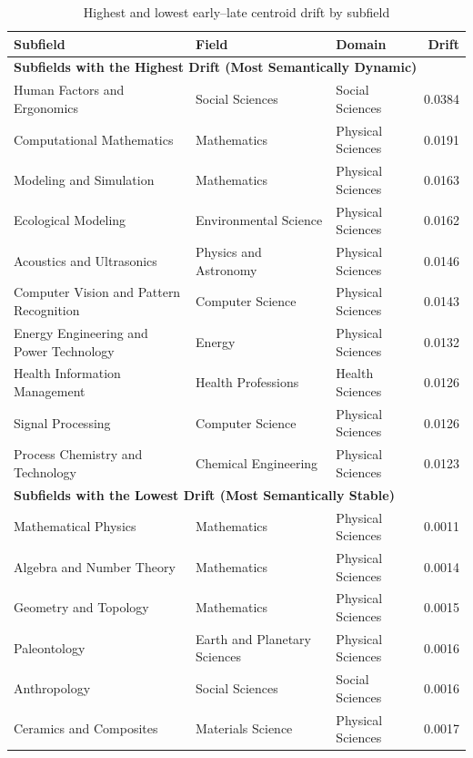 \begin{table}[H]
\centering
\caption[Net semantic displacement extremes]{Highest and lowest early--late centroid drift by subfield}
\label{tab:centroid_drift_extremes}
\scriptsize
\begin{tabular}{@{}p{}p{}p{}r@{}}
\hline
\textbf{Subfield} & \textbf{Field} & \textbf{Domain} & \textbf{Drift} \\
\hline
\multicolumn{4}{l}{\textbf{Subfields with the Highest Drift (Most Semantically Dynamic)}} \\
\hline
Human Factors and Ergonomics & Social Sciences & Social Sciences & 0.0384 \\[0.12cm]
Computational Mathematics & Mathematics & Physical Sciences & 0.0191 \\[0.12cm]
Modeling and Simulation & Mathematics & Physical Sciences & 0.0163 \\[0.12cm]
Ecological Modeling & Environmental Science & Physical Sciences & 0.0162 \\[0.12cm]
Acoustics and Ultrasonics & Physics and Astronomy & Physical Sciences & 0.0146 \\[0.12cm]
Computer Vision and Pattern Recognition & Computer Science & Physical Sciences & 0.0143 \\[0.12cm]
Energy Engineering and Power Technology & Energy & Physical Sciences & 0.0132 \\[0.12cm]
Health Information Management & Health Professions & Health Sciences & 0.0126 \\[0.12cm]
Signal Processing & Computer Science & Physical Sciences & 0.0126 \\[0.12cm]
Process Chemistry and Technology & Chemical Engineering & Physical Sciences & 0.0123 \\[0.12cm]
\hline
\multicolumn{4}{l}{\textbf{Subfields with the Lowest Drift (Most Semantically Stable)}} \\
\hline
Mathematical Physics & Mathematics & Physical Sciences & 0.0011 \\[0.12cm]
Algebra and Number Theory & Mathematics & Physical Sciences & 0.0014 \\[0.12cm]
Geometry and Topology & Mathematics & Physical Sciences & 0.0015 \\[0.12cm]
Paleontology & Earth and Planetary Sciences & Physical Sciences & 0.0016 \\[0.12cm]
Anthropology & Social Sciences & Social Sciences & 0.0016 \\[0.12cm]
Ceramics and Composites & Materials Science & Physical Sciences & 0.0017 \\[0.12cm]

\end{tabular}
\end{table}
